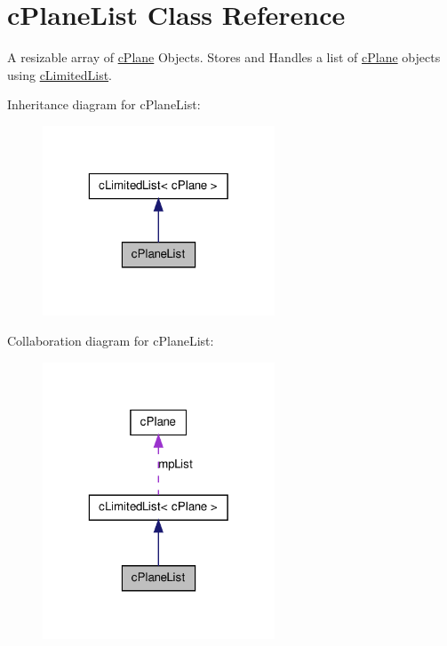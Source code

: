 \hypertarget{classc_plane_list}{
\section{cPlaneList Class Reference}
\label{classc_plane_list}
}


A resizable array of \hyperlink{classc_plane}{cPlane} Objects. Stores and Handles a list of \hyperlink{classc_plane}{cPlane} objects using \hyperlink{classc_limited_list}{cLimitedList}.  




Inheritance diagram for cPlaneList:
\nopagebreak
\begin{figure}[H]
\begin{center}
\leavevmode
\includegraphics[width=196pt]{classc_plane_list__inherit__graph}
\end{center}
\end{figure}


Collaboration diagram for cPlaneList:
\nopagebreak
\begin{figure}[H]
\begin{center}
\leavevmode
\includegraphics[width=196pt]{classc_plane_list__coll__graph}
\end{center}
\end{figure}
